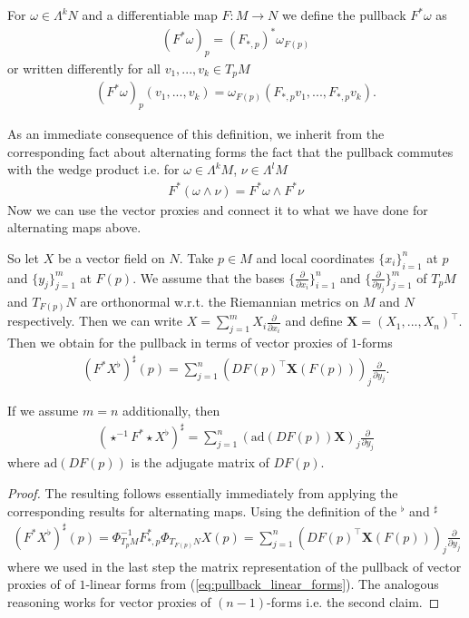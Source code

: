 \documentclass[../master_thesis.tex]{subfiles}
\begin{document}
\begin{definition}
    For $\omega \in \Lambda^k N$ and a differentiable map $F:M \rightarrow N$ 
    we define the pullback $F^*\omega$ as
    \begin{align*}
        (F^*\omega)_p = (F_{*,p})^* \omega_{F(p)}
    \end{align*}
    or written differently for all $v_1,...,v_k \in T_p M$
    \begin{align*}
        (F^*\omega)_p (v_1,...,v_k) = \omega_{F(p)}(F_{*,p} v_1, ..., F_{*,p} v_k).
    \end{align*}
\end{definition}
As an immediate consequence of this definition, we inherit from the corresponding fact about alternating forms
the fact that 
the pullback commutes with the wedge product i.e. for $\omega \in \Lambda^k M$, 
$\nu \in \Lambda^{l} M$
\begin{align*}
    F^*(\omega \wedge \nu ) = F^* \omega \wedge F^* \nu
\end{align*}
Now we can use the vector proxies and connect it to what we have done 
for alternating maps above. 
\begin{proposition}\label{prop:pullback_vector_fields}
    So let $X$ be a vector field on $N$. Take $p \in M$ and local coordinates
    $\{x_i\}_{i=1}^n$ at $p$ and $\{y_j\}_{j=1}^m$ at $F(p)$. We assume that the bases
    $\{ \frac{\partial}{\partial x_i} \}_{i=1}^n$ and 
    $\{ \frac{\partial}{\partial y_j} \}_{j=1}^m$ of $T_p M$ and $T_{F(p)} N$ 
    are orthonormal w.r.t. the Riemannian metrics
    on $M$ and $N$ respectively. 
    Then we can write $X = \sum_{j=1}^m X_i \frac{\partial}{\partial x_i}$
    and define $\mathbf{X} = (X_1,..., X_n)^\top$.
    Then we obtain for the pullback in terms of
    vector proxies of $1$-forms
    \begin{align*}
        (F^* X^\flat)^\sharp(p)
        = \sum_{j=1}^n (DF(p)^\top \mathbf{X}(F(p)))_j \frac{\partial}{\partial y_j}.
    \end{align*}

    If we assume $m=n$ additionally, then 
    \begin{align*}
        (\star^{-1} F^* \star X^\flat)^\sharp 
        = \sum_{j=1}^n (\text{ad}(DF(p)) \mathbf{X})_j \frac{\partial}{\partial y_j}
    \end{align*}
    where $\text{ad}(DF(p))$ is the adjugate matrix of $DF(p)$.
\end{proposition}
\begin{proof}
    The resulting follows essentially immediately from applying the 
    corresponding results for alternating maps. Using the definition of 
    the $^\flat$ and $^\sharp$
    \begin{align*}
        (F^* X^\flat)^\sharp(p)
        = \Phi^{-1}_{T_p M} F_{*,p}^* \Phi_{T_{F(p)}N} X(p)
        = \sum_{j=1}^n (DF(p)^\top \mathbf{X}(F(p)))_j \frac{\partial}{\partial y_j}
    \end{align*}
    where we used in the last step the matrix representation of the pullback of vector proxies of
    of $1$-linear forms from (\ref{eq:pullback_linear_forms}). The analogous reasoning works 
    for vector proxies of $(n-1)$-forms i.e. the second claim.
\end{proof}
\end{document}
